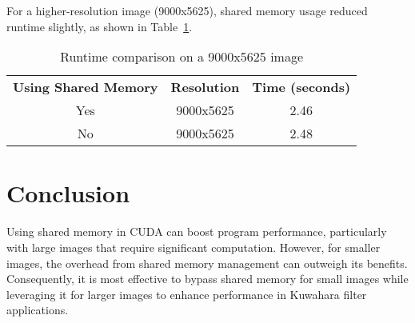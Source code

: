 \documentclass{article}
\begin{document}
    For a higher-resolution image (9000x5625), shared memory usage reduced runtime slightly, as shown in Table~\ref{tab:result_shared_memory_big}.

    \begin{table}[H]
        \centering
        \begin{tabular}{ccc}
           \textbf{Using Shared Memory} & \textbf{Resolution} & \textbf{Time (seconds)} \\
           Yes & 9000x5625 & 2.46 \\
           No  & 9000x5625 & 2.48 \\
        \end{tabular}
        \caption{Runtime comparison on a 9000x5625 image}
        \label{tab:result_shared_memory_big}
    \end{table}

\section{Conclusion}
    Using shared memory in CUDA can boost program performance, particularly with large images that require significant computation. However, for smaller images, the overhead from shared memory management can outweigh its benefits. Consequently, it is most effective to bypass shared memory for small images while leveraging it for larger images to enhance performance in Kuwahara filter applications.
\end{document}
